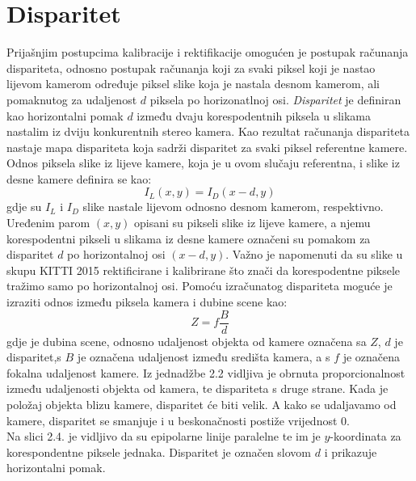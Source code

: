 \documentclass[times, utf8, zavrsni, numeric]{fer}
\begin{document}
\section{Disparitet}
Prijašnjim postupcima kalibracije i rektifikacije omogućen je postupak računanja dispariteta, odnosno postupak računanja koji za svaki piksel koji je nastao lijevom kamerom određuje piksel slike koja je nastala desnom kamerom, ali pomaknutog za udaljenost $d$ piksela po horizonatlnoj osi. \textit{Disparitet} je definiran kao horizontalni pomak $d$ između dvaju korespodentnih piksela u slikama nastalim iz dviju konkurentnih stereo kamera. Kao rezultat računanja dispariteta nastaje mapa dispariteta koja sadrži disparitet za svaki piksel referentne kamere. Odnos piksela slike iz lijeve kamere, koja je u ovom slučaju referentna, i slike iz desne kamere definira se kao: 
\begin{equation}
I_{L}(x, y) = I_{D}(x-d,y)
\label{eq:Disparitet}
\end{equation}
gdje su $I_{L}$ i $I_{D}$ slike nastale lijevom odnosno desnom kamerom, respektivno. Uređenim parom $(x,y)$ opisani su pikseli slike iz lijeve kamere, a njemu korespodentni pikseli u slikama iz desne kamere označeni su pomakom za disparitet $d$ po horizontalnoj osi $(x-d,y)$. Važno je napomenuti da su slike u skupu KITTI 2015 rektificirane i kalibrirane što znači da korespodentne piksele tražimo samo po horizontalnoj osi.
Pomoću izračunatog dispariteta moguće je izraziti odnos između piksela kamera i dubine scene kao:
\begin{equation}
Z=f\frac{B}{d}
\label{eq:Fokalna}
\end{equation}
gdje je dubina scene, odnosno udaljenost objekta od kamere označena sa $Z$, $d$ je disparitet,s $B$ je označena udaljenost između središta kamera, a s $f$ je označena fokalna udaljenost kamere. Iz jednadžbe 2.2 vidljiva je obrnuta proporcionalnost između udaljenosti objekta od kamera, te dispariteta s druge strane. Kada je položaj objekta blizu kamere, disparitet će biti velik. A kako se udaljavamo od kamere, disparitet se smanjuje i u beskonačnosti postiže vrijednost 0.\\
Na slici 2.4. je vidljivo da su epipolarne linije paralelne te im je $y$-koordinata za korespondentne piksele jednaka. Disparitet je označen slovom $d$ i prikazuje horizontalni pomak.
\end{document}
